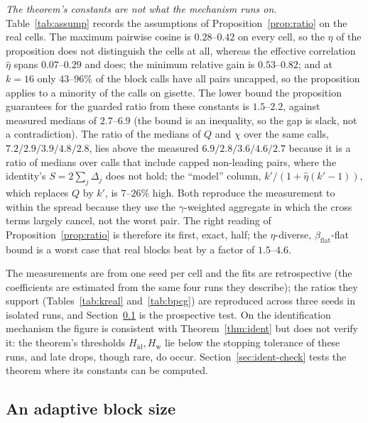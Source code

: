 \emph{The theorem's constants are not what the mechanism runs on.}
Table~\ref{tab:assump} records the assumptions of
Proposition~\ref{prop:ratio} on the real cells. The maximum pairwise
cosine is $0.28$--$0.42$ on every cell, so the $\eta$ of the proposition
does not distinguish the cells at all, whereas the effective correlation
$\hat\eta$ spans $0.07$--$0.29$ and does; the minimum relative gain is
$0.53$--$0.82$; and at $k=16$ only $43$--$96\%$ of the block calls have all
pairs uncapped, so the proposition applies to a minority of the calls on
gisette. The lower bound the proposition guarantees for the guarded
ratio from these constants is $1.5$--$2.2$, against measured medians of
$2.7$--$6.9$ (the bound is an inequality, so the gap is slack, not a
contradiction). The ratio of the medians of $Q$ and $\chi$ over the same calls,
$7.2/2.9/3.9/4.8/2.8$, lies above the measured $6.9/2.8/3.6/4.6/2.7$
because it is a ratio of medians over calls that include capped
non-leading pairs, where the identity's $S=2\sum_j\Delta_j$ does not
hold;
the ``model'' column, $k'/(1+\hat\eta(k'-1))$, which replaces $Q$ by
$k'$, is $7$--$26\%$ high. Both reproduce the measurement to within the
spread because they use the $\gamma$-weighted aggregate in which the
cross terms largely cancel, not the worst pair. The right reading of
Proposition~\ref{prop:ratio} is therefore its first, exact, half; the
$\eta$-diverse, $\beta_{\mathrm{flat}}$-flat bound is a worst case that real blocks beat
by a factor of $1.5$--$4.6$.

The measurements are from one seed per cell and the fits are
retrospective (the coefficients are estimated from the same four runs
they describe); the ratios they support (Tables~\ref{tab:kreal}
and~\ref{tab:bpcg}) are reproduced across three seeds in isolated runs,
and Section~\ref{sec:adaptive} is the prospective test. On the
identification mechanism the figure is consistent with
Theorem~\ref{thm:ident} but does not verify it: the theorem's thresholds
$H_{\mathrm{id}},H_{\mathrm w}$ lie below the stopping tolerance of
these runs, and late drops, though rare, do occur. Section~\ref{sec:ident-check}
tests the theorem where its constants can be computed.

\subsection{An adaptive block size}\label{sec:adaptive}

